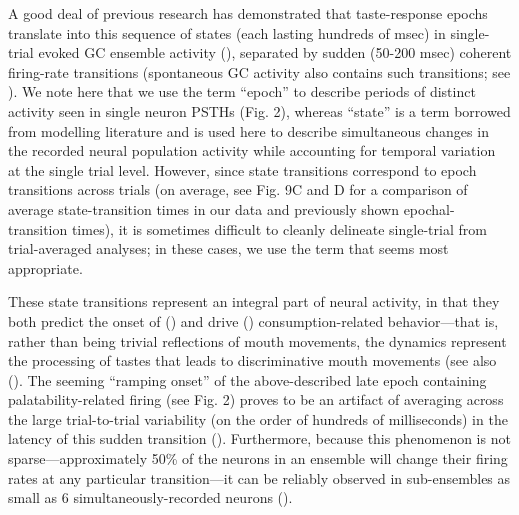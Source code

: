 \begin{refsection}
A good deal of previous research has demonstrated that taste-response epochs translate into this sequence of states (each lasting hundreds of msec) in single-trial evoked GC ensemble activity (\cite{jones2007a,sadacca2016a,mukherjee2019a}), separated by sudden (50-200 msec) coherent firing-rate transitions (spontaneous GC activity also contains such transitions; see \cite{camera2019a,mazzucato2015a}). We note here that we use the term “epoch” to describe periods of distinct activity seen in single neuron PSTHs (Fig. 2), whereas “state” is a term borrowed from modelling literature and is used here to describe simultaneous changes in the recorded neural population activity while accounting for temporal variation at the single trial level. However, since state transitions correspond to epoch transitions across trials (on average, see Fig. 9C and D for a comparison of average state-transition times in our data and previously shown epochal-transition times), it is sometimes difficult to cleanly delineate single-trial from trial-averaged analyses; in these cases, we use the term that seems most appropriate.

These state transitions represent an integral part of neural activity, in that they both predict the onset of (\cite{sadacca2016a}) and drive (\cite{mukherjee2019a}) consumption-related behavior—that is, rather than being trivial reflections of mouth movements, the dynamics represent the processing of tastes that leads to discriminative mouth movements (see also (\cite{jones2007a,katz2001a}). The seeming “ramping onset” of the above-described late epoch containing palatability-related firing (see Fig. 2) proves to be an artifact of averaging across the large trial-to-trial variability (on the order of hundreds of milliseconds) in the latency of this sudden transition (\cite{jones2007a,sadacca2016a}). Furthermore, because this phenomenon is not sparse—approximately 50\% of the neurons in an ensemble will change their firing rates at any particular transition—it can be reliably observed in sub-ensembles as small as 6 simultaneously-recorded neurons (\cite{jones2007a}). 


\end{refsection}
